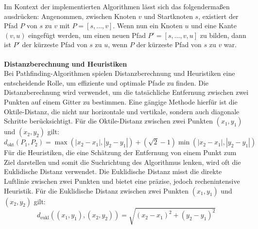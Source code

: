 Im Kontext der implementierten Algorithmen lässt sich das folgendermaßen ausdrücken:
Angenommen, zwischen Knoten $v$ und Startknoten $s$, existiert der Pfad $P$ von $s$ zu $v$ mit $P = [s, \dots, v]$.
Wenn nun ein Knoten $u$ und eine Kante $(v, u)$ eingefügt werden, um einen neuen Pfad $P' = [s, \dots, v, u]$ zu
bilden, dann ist $P'$ der kürzeste Pfad von $s$ zu $u$, wenn $P$ der kürzeste Pfad von $s$ zu $v$ war. \\\\

\textbf{Distanzberechnung und Heuristiken}\\
Bei Pathfinding-Algorithmen spielen Distanzberechnung und Heuristiken eine entscheidende Rolle, um effiziente und optimale Pfade zu finden.
Die Distanzberechnung wird verwendet, um die tatsächliche Entfernung zwischen zwei Punkten auf einem Gitter zu bestimmen.
Eine gängige Methode hierfür ist die Oktile-Distanz, die nicht nur horizontale und vertikale, sondern auch diagonale Schritte berücksichtigt.
Für die Oktile-Distanz zwischen zwei Punkten $(x_1, y_1)$ und $(x_2, y_2)$ gilt:
\begin{equation}
    \label{eq:distance_octile}
    d_\text{okt}(P_1, P_2) = \max(|x_2 - x_1|, |y_2 - y_1|) + ( \sqrt{2} - 1) \min(|x_2 - x_1|, |y_2 - y_1|)
\end{equation}
Für die Heuristiken, die eine Schätzung der Entfernung von einem Punkt zum Ziel darstellen und somit die Suchrichtung
des Algorithmus lenken, wird oft die Euklidische Distanz verwendet.
Die Euklidische Distanz misst die direkte Luftlinie zwischen zwei Punkten und bietet eine präzise, jedoch rechenintensive Heuristik.
Für die Euklidische Distanz zwischen zwei Punkten $(x_1, y_1)$ und $(x_2, y_2)$ gilt:
\begin{equation}
    \label{eq:distance_euklid}
    d_\text{eukl}((x_1, y_1), (x_2, y_2)) = \sqrt{(x_2 - x_1)^2 + (y_2 - y_1)^2}
\end{equation}

